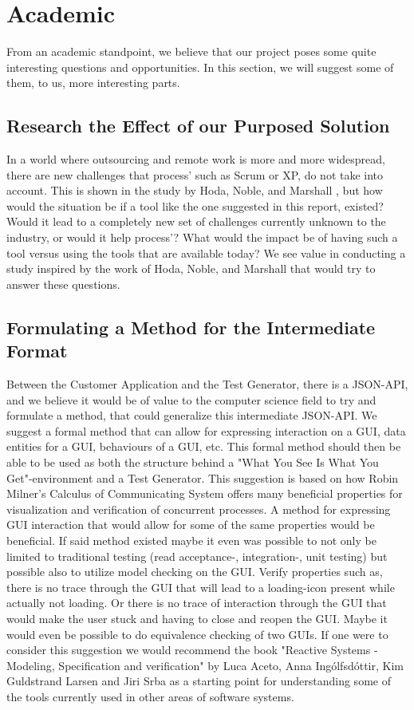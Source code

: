 \section{Academic}
From an academic standpoint, we believe that our project poses some quite interesting questions and opportunities.
In this section, we will suggest some of them, to us, more interesting parts.

\subsection{Research the Effect of our Purposed Solution}
In a world where outsourcing and remote work is more and more widespread, there are new challenges that process' such as Scrum or XP, do not take into account.
This is shown in the study by Hoda, Noble, and Marshall \cite{Hoda2011TheIO}, but how would the situation be if a tool like the one suggested in this report, existed?
Would it lead to a completely new set of challenges currently unknown to the industry, or would it help process'?
What would the impact be of having such a tool versus using the tools that are available today?
We see value in conducting a study inspired by the work of Hoda, Noble, and Marshall that would try to answer these questions.

\subsection{Formulating a Method for the Intermediate Format}
Between the Customer Application and the Test Generator, there is a JSON-API, and we believe it would be of value to the computer science field to try and formulate a method, that could generalize this intermediate JSON-API.
We suggest a formal method that can allow for expressing interaction on a GUI, data entities for a GUI, behaviours of a GUI, etc.
This formal method should then be able to be used as both the structure behind a "What You See Is What You Get"-environment and a Test Generator.
This suggestion is based on how Robin Milner's Calculus of Communicating System offers many beneficial properties for visualization and verification of concurrent processes.
A method for expressing GUI interaction that would allow for some of the same properties would be beneficial.
If said method existed maybe it even was possible to not only be limited to traditional testing (read acceptance-, integration-, unit testing) but possible also to utilize model checking on the GUI.
Verify properties such as, there is no trace through the GUI that will lead to a loading-icon present while actually not loading.
Or there is no trace of interaction through the GUI that would make the user stuck and having to close and reopen the GUI.
Maybe it would even be possible to do equivalence checking of two GUIs.
If one were to consider this suggestion we would recommend the book "Reactive Systems - Modeling, Specification and verification" by Luca Aceto, Anna Ingólfsdóttir, Kim Guldstrand Larsen and Jiri Srba as a starting point for understanding some of the tools currently used in other areas of software systems.
